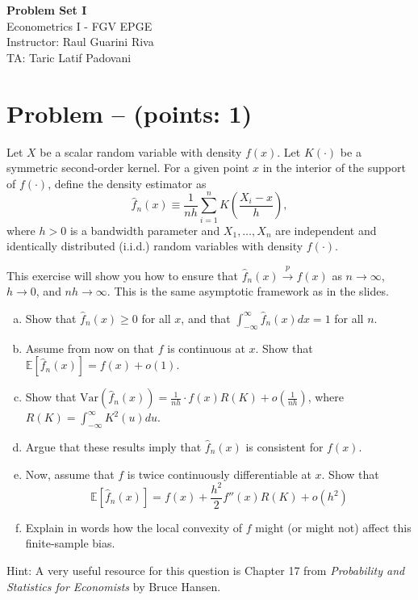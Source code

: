 \documentclass[11pt]{article}
\theoremstyle{definition}
\newcommand{\Var}{\mathrm{Var}}
\newcounter{problem}
\renewcommand{\theproblem}{\arabic{problem}}
\newcommand{\problem}[1]{
	\stepcounter{problem}
	\section*{Problem \theproblem{} -- (points: #1)}
}
\begin{document}
	\begin{center}
		{\LARGE{\textbf{Problem Set I}}}\\
		\vspace{0.2cm}
		Econometrics I - \textcolor{FGVBlue}{FGV EPGE}\\
		Instructor: Raul Guarini Riva \\
		TA: Taric Latif Padovani
	\end{center}

\problem{1}
Let $X$ be a scalar random variable with density $f(x)$. Let $K(\cdot)$ be a symmetric second-order kernel. For a given point $x$ in the interior of the support of $f(\cdot)$, define the density estimator as
\[\hat{f}_n(x) \equiv \frac{1}{nh} \sum_{i=1}^n K\left(\frac{X_i - x}{h}\right),\]
where \(h > 0\) is a bandwidth parameter and \(X_1, \ldots, X_n\) are independent and identically distributed (i.i.d.) random variables with density \(f(\cdot)\).

This exercise will show you how to ensure that $\hat{f}_n(x) \xrightarrow{p} f(x)$ as \(n \rightarrow \infty\), $h \rightarrow 0$, and $nh \rightarrow \infty$. This is the same asymptotic framework as in the slides.

\begin{enumerate}[a)]
	\item Show that $\hat{f}_n(x) \geq 0$ for all $x$, and that $\int_{-\infty}^{\infty} \hat{f}_n(x) dx = 1$ for all $n$.
	\item Assume from now on that $f$ is continuous at $x$. Show that $\mathbb{E}[\hat{f}_n(x)] = f(x) + o(1)$.
	\item Show that $\Var(\hat{f}_n(x)) = \frac{1}{nh}\cdot f(x)R(K) + o\left(\frac{1}{nh}\right)$, where \(R(K) = \int_{-\infty}^{\infty} K^2(u) du\).
	\item Argue that these results imply that $\hat{f}_n(x)$ is consistent for $f(x)$.
	\item Now, assume that $f$ is twice continuously differentiable at $x$. Show that 
	\begin{equation*}
		\mathbb{E}[\hat{f}_n(x)] = f(x) + \frac{h^2}{2}f''(x)R(K) + o(h^2)
	\end{equation*}
	\item Explain in words how the local convexity of $f$ might (or might not) affect this finite-sample bias.
\end{enumerate}

Hint: A very useful resource for this question is Chapter 17 from \textit{Probability and Statistics for Economists} by Bruce Hansen.
\end{document}
